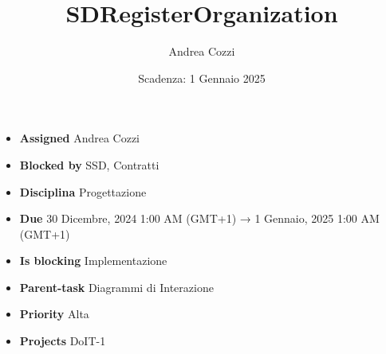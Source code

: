 \title{SDRegisterOrganization}
\author{Andrea Cozzi}
\date{Scadenza: 1 Gennaio 2025}

\maketitle

\begin{itemize}
    \item \textbf{Assigned} Andrea Cozzi
    \item \textbf{Blocked by} SSD, Contratti
    \item \textbf{Disciplina} Progettazione
    \item \textbf{Due} 30 Dicembre, 2024 1:00 AM (GMT+1) → 1 Gennaio, 2025 1:00 AM (GMT+1)
    \item \textbf{Is blocking} Implementazione
    \item \textbf{Parent-task} Diagrammi di Interazione
    \item \textbf{Priority} Alta
    \item \textbf{Projects} DoIT-1
\end{itemize}